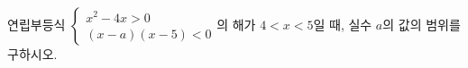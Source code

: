 \hspace*{2mm}\begin{minipage}[t]{\dimexpr\linewidth-2mm\relax}\vspace{0pt}
연립부등식 $\begin{cases} x^2-4x>0 \\ (x-a)(x-5)<0 \end{cases}$의 해가 $4<x<5$일 때, 실수 $a$의 값의 범위를 구하시오.\end{minipage}
